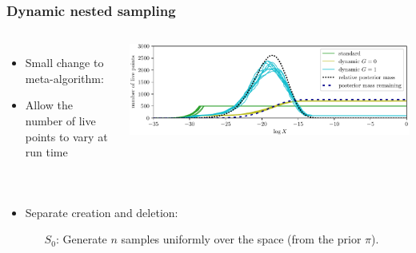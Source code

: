 \documentclass[aspectratio=169,handout]{beamer}
\begin{document}
\begin{frame}
    \frametitle{Dynamic nested sampling}
    \begin{columns}
        \begin{itemize}
            \item Small change to meta-algorithm: 
            \item Allow the number of live points to vary at run time 
        \end{itemize}
        \includegraphics[width=\textwidth]{figures/dynesty}
    \end{columns}
    \begin{columns}
        \begin{itemize}
            \item Separate creation and deletion:
                \begin{itemize}
                    \item[$S_0$:] Generate $n$ samples uniformly over the space (from the prior $\pi$). 


\end{itemize}
\end{itemize}
\end{columns}
\end{frame}
\end{document}
